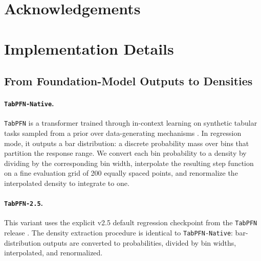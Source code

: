 \documentclass{article}
\newcommand{\method}[1]{\texttt{#1}}
\begin{document}
\section*{Acknowledgements}







\appendix



\section{Implementation Details}
\label{app:implementation}

\subsection{From Foundation-Model Outputs to Densities}
\label{app:tfm_details}

\paragraph{\method{TabPFN-Native}.}
\method{TabPFN} is a transformer trained through in-context learning on
synthetic tabular tasks sampled from a prior over data-generating mechanisms
\citep{hollmann2025tabpfn}. In regression mode, it outputs a bar distribution:
a discrete probability mass over bins that partition the response range. We
convert each bin probability to a density by dividing by the corresponding bin
width, interpolate the resulting step function on a fine evaluation grid of 200
equally spaced points, and renormalize the interpolated density to integrate to
one.

\paragraph{\method{TabPFN-2.5}.}
This variant uses the explicit v2.5 default regression checkpoint from the
\method{TabPFN} release \citep{hollmann2025tabpfn}. The density extraction
procedure is identical to \method{TabPFN-Native}: bar-distribution outputs are
converted to probabilities, divided by bin widths, interpolated, and
renormalized.
\end{document}
